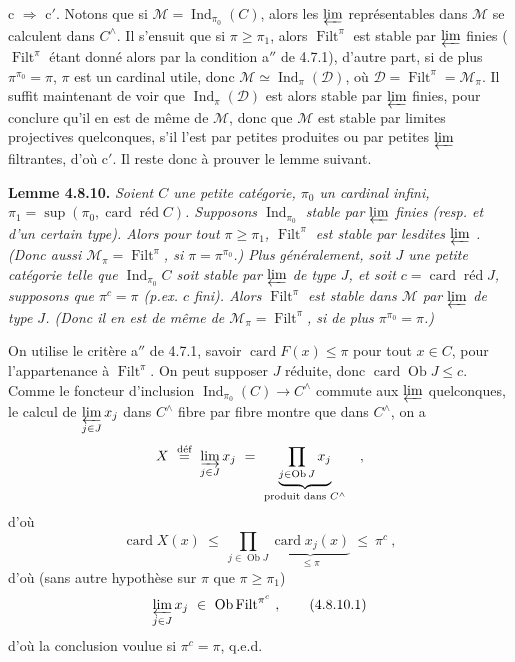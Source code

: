 \documentclass[11pt]{article}
\newcommand{\printedpage}[1]{\marginpar{\footnotesize p.~#1}}
\newcommand{\msp}[1]{\marginpar{\footnotesize [#1]}}
\newcommand{\Filt}{\operatorname{Filt}}
\newcommand{\card}{\operatorname{card}}
\newcommand{\Ob}{\operatorname{Ob}}
\newcommand{\Ind}{\operatorname{Ind}}
\newcommand{\red}{\operatorname{\text{réd}}}
\newcommand{\cM}{\mathcal{M}}
\newcommand{\defeq}{\overset{\text{déf}}{=}}
\begin{document}
c $\Longrightarrow$ c$'$. Notons que si $\mathcal{M}=\Ind_{\pi_0}(C)$, alors les $\varprojlim$ représentables dans $\mathcal{M}$ se calculent dans $C^\wedge$. Il s'ensuit que si $\pi\geqslant\pi_1$, alors $\Filt^\pi$ est stable par $\varprojlim$ finies ($\Filt^\pi$ étant donné alors par la condition a$''$ de 4.7.1), d'autre part, si de plus $\pi^{\pi_0}=\pi$, $\pi$ est un cardinal utile, donc $\mathcal{M}\simeq\Ind_\pi(\mathcal{D})$, où $\mathcal{D}=\Filt^\pi=\mathcal{M}_\pi$. Il suffit maintenant de voir que $\Ind_\pi(\mathcal{D})$ est alors stable par $\varprojlim$ finies, pour conclure qu'il en est de même de $\mathcal{M}$, donc que $\mathcal{M}$ est stable par limites projectives quelconques, s'il l'est par petites produites ou par petites $\varprojlim$ filtrantes, d'où c$'$. Il reste donc à prouver le lemme suivant. %

\printedpage{74}

\textbf{Lemme 4.8.10.} \textit{Soient $C$ une petite catégorie, $\pi_0$ un cardinal infini, $\pi_1 = \sup(\pi_0, \card\red C)$. Supposons $\Ind_{\pi_0}$ stable par $\varprojlim$ finies (resp. et d'un certain type). Alors pour tout $\pi \geqslant \pi_1$, $\Filt^{\pi}$ est stable par lesdites $\varprojlim$ . (Donc aussi $\cM_{\pi} = \Filt^{\pi}$, si $\pi = \pi^{\pi_0}$.) Plus} %
\msp{page 209}
\textit{généralement, soit $J$ une petite catégorie telle que $\Ind_{\pi_0}C$ soit stable par $\varprojlim$ de type $J$, et soit $c = \card\red J$, supposons que $\pi^{c} = \pi$ (p.ex. $c$ fini). Alors $\Filt^{\pi}$ est stable dans $\cM$ par $\varprojlim$ de type $J$. (Donc il en est de même de $\cM_{\pi} = \Filt^{\pi}$, si de plus $\pi^{\pi_0} = \pi$.)}

On utilise le critère a$''$ de 4.7.1, savoir $\card F(x) \leqslant \pi$ pour tout $x \in C$, pour l'appartenance à $\Filt^{\pi}$. On peut supposer $J$ réduite, donc $\card\Ob J \leqslant c$. Comme le foncteur d'inclusion $\Ind_{\pi_0}(C) \longrightarrow C^{\wedge}$ commute aux $\varprojlim$ quelconques, le calcul de $\varprojlim\limits_{j\in J} x_j$ dans $C^{\wedge}$ fibre par fibre montre que dans $C^{\wedge}$, on a
\[
X \ \defeq\ \varinjlim_{j\in J} x_j \ = \ \underbrace{\prod_{j\in\Ob J} x_j}_{\text{produit dans } C^{\wedge}} \quad ,
\] %
d'où
\[
\card X(x) \ \leqslant\ \prod_{j\in\Ob J} \underbrace{\card x_j(x)}_{\leqslant\pi} \ \leqslant\ \pi^{c}\ ,
\]
d'où (sans autre hypothèse sur $\pi$ que $\pi \geqslant \pi_1$)
\[
\varprojlim_{j\in J} x_j \ \in\ \Ob\Filt^{\pi^{c}}\ , \tag*{(4.8.10.1)}
\]
d'où la conclusion voulue si $\pi^{c} = \pi$, q.e.d.
\end{document}
